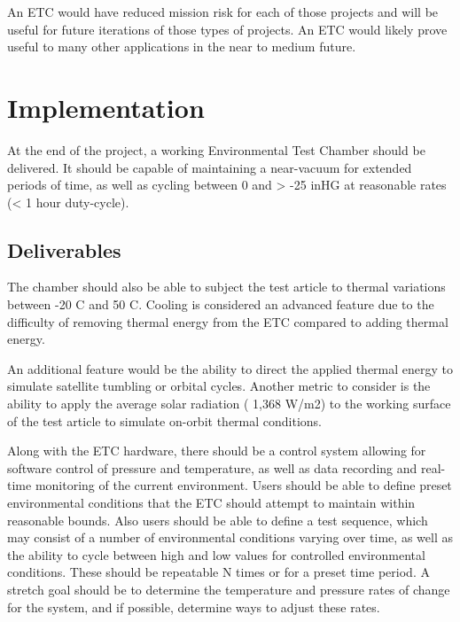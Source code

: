 \documentclass[conference]{IEEEtran} %
\begin{document}
An ETC would have reduced mission risk for each of those projects and will be useful for future iterations of those types of projects. An ETC would likely prove useful to many other applications in the near to medium future.



\section{Implementation}
\label{sec:implementation}
  At the end of the project, a working Environmental Test Chamber should be delivered. It should be capable of maintaining a near-vacuum for extended periods of time, as well as cycling between 0 and > -25 inHG at reasonable rates (< 1 hour duty-cycle).
\subsection{Deliverables}
\label{subsec:deliverables}
  The chamber should also be able to subject the test article to thermal variations between -20 C and 50 C. Cooling is considered an advanced feature due to the difficulty of removing thermal energy from the ETC compared to adding thermal energy. 

  An additional feature would be the ability to direct the applied thermal energy to simulate satellite tumbling or orbital cycles. Another metric to consider is the ability to apply the average solar radiation ( 1,368 W/m2) to the working surface of the test article to simulate on-orbit thermal conditions.

  Along with the ETC hardware, there should be a control system allowing for software control of pressure and temperature, as well as data recording and real-time monitoring of the current environment. Users should be able to define preset environmental conditions that the ETC should attempt to maintain within reasonable bounds. Also users should be able to define a test sequence, which may consist of a number of environmental conditions varying over time, as well as the ability to cycle between high and low values for controlled environmental conditions. These should be repeatable N times or for a preset time period. A stretch goal should be to determine the temperature and pressure rates of change for the system, and if possible, determine ways to adjust these rates.
\end{document}
